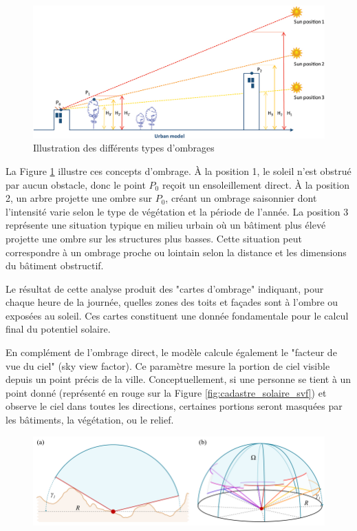 {\begin{itemize}
\end{itemize}
\begin{figure}[H]
    \centering
    \includegraphics[width=1.00\linewidth]{02-main/figures/cadastre_solaire_ombrage.jpg}
    \caption{Illustration des différents types d'ombrages \cite{desthieux_solar_2018}}
    \label{fig:cadastre_solaire_ombrage}
\end{figure}
\par{La Figure \ref{fig:cadastre_solaire_ombrage} illustre ces concepts d'ombrage. À la position 1, le soleil n'est obstrué par aucun obstacle, donc le point $P_0$ reçoit un ensoleillement direct. À la position 2, un arbre projette une ombre sur $P_0$, créant un ombrage saisonnier dont l'intensité varie selon le type de végétation et la période de l'année. La position 3 représente une situation typique en milieu urbain où un bâtiment plus élevé projette une ombre sur les structures plus basses. Cette situation peut correspondre à un ombrage proche ou lointain selon la distance et les dimensions du bâtiment obstructif.}
\par{Le résultat de cette analyse produit des "cartes d'ombrage" indiquant, pour chaque heure de la journée, quelles zones des toits et façades sont à l'ombre ou exposées au soleil. Ces cartes constituent une donnée fondamentale pour le calcul final du potentiel solaire.}
\par{En complément de l'ombrage direct, le modèle calcule également le "facteur de vue du ciel" (sky view factor). Ce paramètre mesure la portion de ciel visible depuis un point précis de la ville. Conceptuellement, si une personne se tient à un point donné (représenté en rouge sur la Figure \ref{fig:cadastre_solaire_svf}) et observe le ciel dans toutes les directions, certaines portions seront masquées par les bâtiments, la végétation, ou le relief.}
\begin{figure}[H]
    \centering
    \includegraphics[width=1\linewidth]{cadastre_solaire_svf.png}

\end{figure}}
